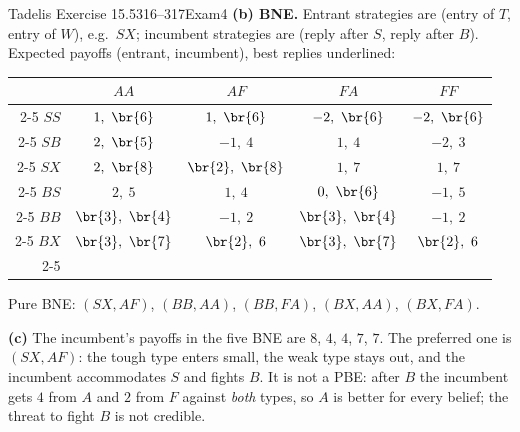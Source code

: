 \begin{exsol}{Tadelis Exercise 15.5}{316--317}{Exam}{4}
\textbf{(b) BNE.} Entrant strategies are (entry of $T$, entry of $W$), e.g.\ $SX$; incumbent
strategies are (reply after $S$, reply after $B$). Expected payoffs (entrant, incumbent), best
replies underlined:
\begin{center}
\begin{tabular}{r|c|c|c|c|}
\multicolumn{1}{r}{} & \multicolumn{1}{c}{$AA$} & \multicolumn{1}{c}{$AF$} & \multicolumn{1}{c}{$FA$} & \multicolumn{1}{c}{$FF$} \\ \cline{2-5}
$SS$ & $1,\ \br{6}$ & $1,\ \br{6}$ & $-2,\ \br{6}$ & $-2,\ \br{6}$ \\ \cline{2-5}
$SB$ & $2,\ \br{5}$ & $-1,\ 4$ & $1,\ 4$ & $-2,\ 3$ \\ \cline{2-5}
$SX$ & $2,\ \br{8}$ & $\br{2},\ \br{8}$ & $1,\ 7$ & $1,\ 7$ \\ \cline{2-5}
$BS$ & $2,\ 5$ & $1,\ 4$ & $0,\ \br{6}$ & $-1,\ 5$ \\ \cline{2-5}
$BB$ & $\br{3},\ \br{4}$ & $-1,\ 2$ & $\br{3},\ \br{4}$ & $-1,\ 2$ \\ \cline{2-5}
$BX$ & $\br{3},\ \br{7}$ & $\br{2},\ 6$ & $\br{3},\ \br{7}$ & $\br{2},\ 6$ \\ \cline{2-5}
\end{tabular}
\end{center}
Pure BNE: $(SX, AF)$, $(BB, AA)$, $(BB, FA)$, $(BX, AA)$, $(BX, FA)$.

\textbf{(c)} The incumbent's payoffs in the five BNE are $8$, $4$, $4$, $7$, $7$. The preferred one is
$(SX, AF)$: the tough type enters small, the weak type stays out, and the incumbent accommodates $S$ and
fights $B$. It is not a PBE: after $B$ the incumbent gets $4$ from $A$ and $2$ from $F$ against
\emph{both} types, so $A$ is better for every belief; the threat to fight $B$ is not credible.


\end{exsol}
